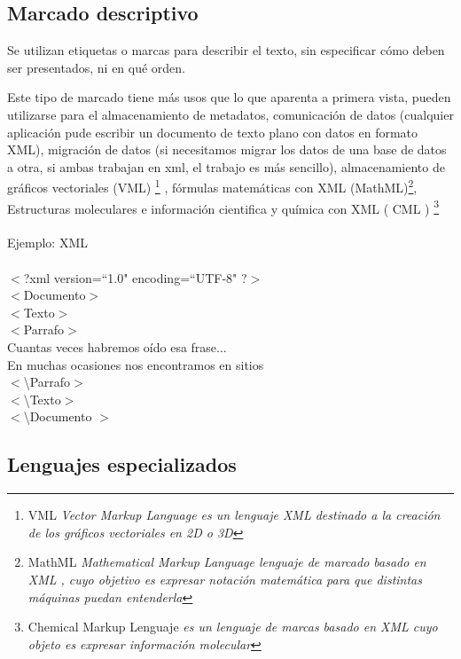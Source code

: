 \subsection{Marcado descriptivo}\label{marcado-descriptivo}

Se utilizan etiquetas o marcas para describir el texto, sin especificar cómo deben ser presentados, ni en qué orden.

Este tipo de marcado tiene más usos que lo que aparenta a primera vista, pueden utilizarse para el almacenamiento de metadatos, comunicación de datos (cualquier aplicación pude escribir un documento de texto plano con datos en formato XML), migración de datos (si necesitamos migrar los datos de una base de datos a otra, si ambas trabajan en xml, el trabajo es más sencillo), almacenamiento de gráficos vectoriales (VML) \footnote{VML \textit{Vector Markup Language es un lenguaje XML destinado a la creación de los gráficos vectoriales en 2D o 3D}} \cite{noauthor_vector_2016:a}, fórmulas matemáticas con XML (MathML)\footnote{MathML \textit{Mathematical Markup Language lenguaje de marcado basado en XML \cite{noauthor_usos_2003:a}, cuyo objetivo es expresar notación matemática para que distintas máquinas puedan entenderla}}, Estructuras moleculares e información cientifica y química con XML ( CML ) \footnote{Chemical Markup Lenguaje \cite{noauthor_chemical_2016:a} \textit{es un lenguaje de marcas basado en XML cuyo objeto es expresar información molecular}} \cite{desarrolloweb.com_objetivos_nodate:b}
\\
\\
Ejemplo: XML
\\
\\
$<$?xml version=``1.0" encoding=``UTF-8" ?$>$
\\
$<$Documento$>$
\\
	 \tab $<$Texto$>$
	\\
		 \tab \tab $<$Parrafo$>$
		\\
			\tab\tab\tab Cuantas veces habremos oído esa frase...
			\\
			\tab\tab\tab En muchas ocasiones nos encontramos en sitios
			\\
		 \tab \tab $<$\textbackslash Parrafo$>$
		\\
	 \tab $<$\textbackslash Texto$>$
	\\
$<$\textbackslash Documento $>$


\subsection{Lenguajes especializados}\label{lenguajes-especializados}



